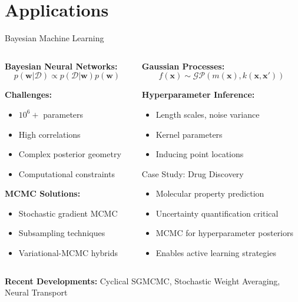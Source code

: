 \documentclass[aspectratio=169,11pt]{beamer}
\begin{document}
\section{Applications}

\begin{frame}{Bayesian Machine Learning}
\begin{columns}
\begin{column}{0.5\textwidth}
\textbf{Bayesian Neural Networks:}
\[p(\mathbf{w} | \mathcal{D}) \propto p(\mathcal{D} | \mathbf{w}) p(\mathbf{w})\]

\textbf{Challenges:}
\begin{itemize}
\item $10^6+$ parameters
\item High correlations
\item Complex posterior geometry
\item Computational constraints
\end{itemize}

\textbf{MCMC Solutions:}
\begin{itemize}
\item Stochastic gradient MCMC
\item Subsampling techniques
\item Variational-MCMC hybrids
\end{itemize}
\end{column}
\begin{column}{0.5\textwidth}
\textbf{Gaussian Processes:}
\[f(\mathbf{x}) \sim \mathcal{GP}(m(\mathbf{x}), k(\mathbf{x}, \mathbf{x}'))\]

\textbf{Hyperparameter Inference:}
\begin{itemize}
\item Length scales, noise variance
\item Kernel parameters
\item Inducing point locations
\end{itemize}

\begin{block}{Case Study: Drug Discovery}
\begin{itemize}
\item Molecular property prediction
\item Uncertainty quantification critical
\item MCMC for hyperparameter posteriors
\item Enables active learning strategies
\end{itemize}
\end{block}
\end{column}
\end{columns}

\vspace{0.3cm}
\textbf{Recent Developments:} Cyclical SGMCMC, Stochastic Weight Averaging, Neural Transport
\end{frame}
\end{document}
